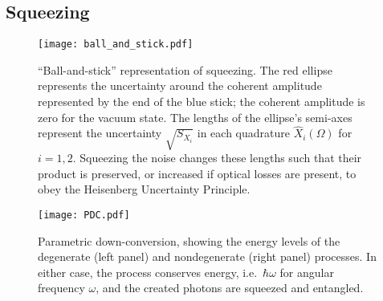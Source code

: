 


\subsection{Squeezing}
\label{sec:squeezing_background}

\begin{figure}
	\centering
	\texttt{[image: ball\_and\_stick.pdf]}
	\caption{``Ball-and-stick'' representation of squeezing. The red ellipse represents the uncertainty around the coherent amplitude represented by the end of the blue stick; the coherent amplitude is zero for the vacuum state. The lengths of the ellipse's semi-axes represent the uncertainty $\sqrt{S_{X_i}}$ in each quadrature $\hat X_i(\Omega)$ for $i=1,2$. Squeezing the noise changes these lengths such that their product is preserved, or increased if optical losses are present, to obey the Heisenberg Uncertainty Principle.}
	\label{fig:ballandstick_simple}
\end{figure}
\begin{figure}[ht]
	\centering
	\texttt{[image: PDC.pdf]}
	\caption{Parametric down-conversion, showing the energy levels of the degenerate (left panel) and nondegenerate (right panel) processes. In either case, the process conserves energy, i.e.\ $\hbar\omega$ for angular frequency $\omega$, and the created photons are squeezed and entangled.}
	\label{fig:PDC_deg_and_nondeg}
\end{figure}

